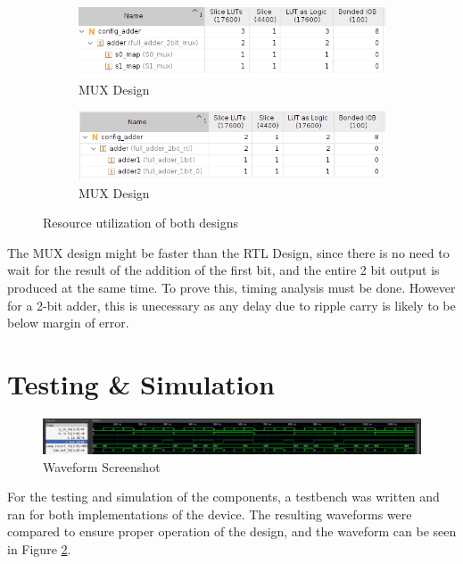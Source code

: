 \documentclass[12pt]{article}
\begin{document}
\begin{figure}[hbtp]
    \centering
    \begin{subfigure}{0.45\linewidth}
        \centering
        \includegraphics[width=\textwidth]{mux-resource.png}
        \caption{MUX Design}
    \end{subfigure}
    \begin{subfigure}{0.45\linewidth}
        \centering
        \includegraphics[width=\textwidth]{rtl-resource.png}
        \caption{MUX Design}
    \end{subfigure}
    \caption{Resource utilization of both designs}
    \label{fig:resource}
\end{figure}

The MUX design might be faster than the RTL Design,
since there is no need to wait for the result of the addition of the first bit,
and the entire 2 bit output is produced at the same time. To prove this, timing analysis must be done.
However for a 2-bit adder, this is unecessary as any delay due to ripple carry is likely to be below margin of error.

\section{Testing \& Simulation}

\begin{figure}[h]
    \centering
    \includegraphics[width=\linewidth]{tb-result.png}
    \caption{Waveform Screenshot}
    \label{fig:tb-result}
\end{figure}

For the testing and simulation of the components, a testbench was written and ran for both implementations of the device.
The resulting waveforms were compared to ensure proper operation of the design, and the waveform can be seen in Figure \ref{fig:tb-result}.
\end{document}
